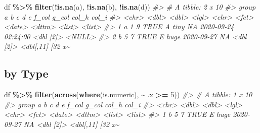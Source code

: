 \documentclass[
]{report}
\newenvironment{Shaded}{\begin{snugshade}}{\end{snugshade}}
\newcommand{\CommentTok}[1]{\textcolor[rgb]{0.56,0.35,0.01}{\textit{#1}}}
\newcommand{\DecValTok}[1]{\textcolor[rgb]{0.00,0.00,0.81}{#1}}
\newcommand{\KeywordTok}[1]{\textcolor[rgb]{0.13,0.29,0.53}{\textbf{#1}}}
\newcommand{\NormalTok}[1]{#1}
\newcommand{\OperatorTok}[1]{\textcolor[rgb]{0.81,0.36,0.00}{\textbf{#1}}}
\newcommand{\StringTok}[1]{\textcolor[rgb]{0.31,0.60,0.02}{#1}}
\begin{document}
\begin{Shaded}
\begin{Highlighting}[]
\NormalTok{df }\OperatorTok{\%\textgreater{}\%}
\StringTok{  }\KeywordTok{filter}\NormalTok{(}\OperatorTok{!}\KeywordTok{is.na}\NormalTok{(a), }\OperatorTok{!}\KeywordTok{is.na}\NormalTok{(b), }\OperatorTok{!}\KeywordTok{is.na}\NormalTok{(d))}
\CommentTok{\#\textgreater{} \# A tibble: 2 x 10}
\CommentTok{\#\textgreater{}   group     a     b c     d     e     f\_col      g\_col               col\_h     col\_i           }
\CommentTok{\#\textgreater{}   \textless{}chr\textgreater{} \textless{}dbl\textgreater{} \textless{}dbl\textgreater{} \textless{}lgl\textgreater{} \textless{}chr\textgreater{} \textless{}fct\textgreater{} \textless{}date\textgreater{}     \textless{}dttm\textgreater{}              \textless{}list\textgreater{}    \textless{}list\textgreater{}          }
\CommentTok{\#\textgreater{} 1 a         1     9 TRUE  A     tiny  NA         2020{-}09{-}24 02:24:00 \textless{}dbl [2]\textgreater{} \textless{}NULL\textgreater{}          }
\CommentTok{\#\textgreater{} 2 b         5     7 TRUE  E     huge  2020{-}09{-}27 NA                  \textless{}dbl [2]\textgreater{} \textless{}dbl[,11] [32 x\textasciitilde{}}
\end{Highlighting}
\end{Shaded}

\hypertarget{by-type}{%
\subsection{by Type}\label{by-type}}

\begin{Shaded}
\begin{Highlighting}[]
\NormalTok{df }\OperatorTok{\%\textgreater{}\%}
\StringTok{  }\KeywordTok{filter}\NormalTok{(}\KeywordTok{across}\NormalTok{(}\KeywordTok{where}\NormalTok{(is.numeric), }\OperatorTok{\textasciitilde{}}\StringTok{ }\NormalTok{.x }\OperatorTok{\textgreater{}=}\StringTok{ }\DecValTok{5}\NormalTok{))}
\CommentTok{\#\textgreater{} \# A tibble: 1 x 10}
\CommentTok{\#\textgreater{}   group     a     b c     d     e     f\_col      g\_col               col\_h     col\_i           }
\CommentTok{\#\textgreater{}   \textless{}chr\textgreater{} \textless{}dbl\textgreater{} \textless{}dbl\textgreater{} \textless{}lgl\textgreater{} \textless{}chr\textgreater{} \textless{}fct\textgreater{} \textless{}date\textgreater{}     \textless{}dttm\textgreater{}              \textless{}list\textgreater{}    \textless{}list\textgreater{}          }
\CommentTok{\#\textgreater{} 1 b         5     7 TRUE  E     huge  2020{-}09{-}27 NA                  \textless{}dbl [2]\textgreater{} \textless{}dbl[,11] [32 x\textasciitilde{}}
\end{Highlighting}
\end{Shaded}
\end{document}

